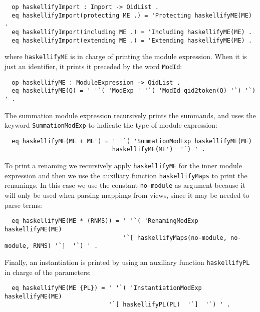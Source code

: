 {\codesize
\begin{verbatim}
  op haskellifyImport : Import -> QidList .
  eq haskellifyImport(protecting ME .) = 'Protecting haskellifyME(ME) .
  eq haskellifyImport(including ME .) = 'Including haskellifyME(ME) .
  eq haskellifyImport(extending ME .) = 'Extending haskellifyME(ME) .
\end{verbatim}
}

\noindent where \verb"haskellifyME" is in charge of printing the 
module expression. When it is just an identifier, it prints it 
preceded by the word \verb"ModId":

{\codesize
\begin{verbatim}
  op haskellifyME : ModuleExpression -> QidList .
  eq haskellifyME(Q) = ' '`( 'ModExp ' '`( 'ModId qid2token(Q) '`) '`) ' .
\end{verbatim}
}

The summation module expression recursively prints the summands, and uses
the keyword \verb"SummationModExp" to indicate the type of module expression:

{\codesize
\begin{verbatim}
  eq haskellifyME(ME + ME') = ' '`( 'SummationModExp haskellifyME(ME) 
                              haskellifyME(ME')  '`) ' .
\end{verbatim}
}

To print a renaming we recursively apply \verb"haskellifyME" for the inner
module expression and then we use the auxiliary function \verb"haskellifyMaps" to 
print the renamings. In this case we use the constant \verb"no-module" as argument
because it will only be used when parsing mappings from views, since it may
be needed to parse terms:

{\codesize
\begin{verbatim}
  eq haskellifyME(ME * (RNMS)) = ' '`( 'RenamingModExp haskellifyME(ME) 
                                 '`[ haskellifyMaps(no-module, no-module, RNMS) '`]  '`) ' .
\end{verbatim}
}

Finally, an instantiation is printed by using an auxiliary function \verb"haskellifyPL"
in charge of the parameters:

{\codesize
\begin{verbatim}
  eq haskellifyME(ME {PL}) = ' '`( 'InstantiationModExp haskellifyME(ME) 
                             '`[ haskellifyPL(PL)  '`]  '`) ' .
\end{verbatim}
}
